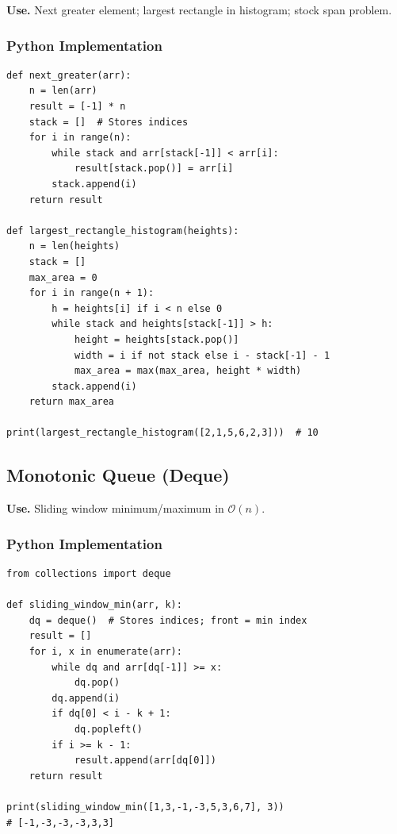 \documentclass[10pt,a4paper]{article}
\theoremstyle{cpstyle}
\newcommand{\bigO}[1]{\mathcal{O}\!\left(#1\right)}
\begin{document}
\textbf{Use.} Next greater element; largest rectangle in histogram; stock span problem.

\subsubsection{Python Implementation}
\begin{lstlisting}[caption={Monotonic Stack -- next greater element and histogram}]
def next_greater(arr):
    n = len(arr)
    result = [-1] * n
    stack = []  # Stores indices
    for i in range(n):
        while stack and arr[stack[-1]] < arr[i]:
            result[stack.pop()] = arr[i]
        stack.append(i)
    return result

def largest_rectangle_histogram(heights):
    n = len(heights)
    stack = []
    max_area = 0
    for i in range(n + 1):
        h = heights[i] if i < n else 0
        while stack and heights[stack[-1]] > h:
            height = heights[stack.pop()]
            width = i if not stack else i - stack[-1] - 1
            max_area = max(max_area, height * width)
        stack.append(i)
    return max_area

print(largest_rectangle_histogram([2,1,5,6,2,3]))  # 10
\end{lstlisting}

\subsection{Monotonic Queue (Deque)}

\textbf{Use.} Sliding window minimum/maximum in $\bigO{n}$.

\subsubsection{Python Implementation}
\begin{lstlisting}[caption={Monotonic Deque -- sliding window minimum}]
from collections import deque

def sliding_window_min(arr, k):
    dq = deque()  # Stores indices; front = min index
    result = []
    for i, x in enumerate(arr):
        while dq and arr[dq[-1]] >= x:
            dq.pop()
        dq.append(i)
        if dq[0] < i - k + 1:
            dq.popleft()
        if i >= k - 1:
            result.append(arr[dq[0]])
    return result

print(sliding_window_min([1,3,-1,-3,5,3,6,7], 3))
# [-1,-3,-3,-3,3,3]
\end{lstlisting}
\end{document}

